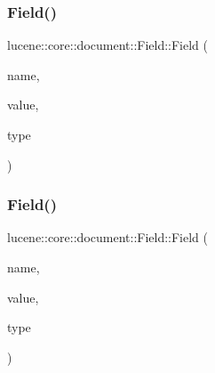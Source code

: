 \mbox{\label{classlucene_1_1core_1_1document_1_1Field_af5870317c74d273ed0afd4715904a9e5}} 
\subsubsection{\texorpdfstring{Field()}{Field()}\hspace{0.1cm}{\footnotesize\ttfamily [8/11]}}
{\footnotesize\ttfamily lucene\+::core\+::document\+::\+Field\+::\+Field (\begin{DoxyParamCaption}\item[{\mbox{\hyperlink{ZlibCrc32_8h_a2c212835823e3c54a8ab6d95c652660e}{const}} std\+::string \&}]{name,  }\item[{\mbox{\hyperlink{ZlibCrc32_8h_a2c212835823e3c54a8ab6d95c652660e}{const}} std\+::string \&}]{value,  }\item[{\mbox{\hyperlink{ZlibCrc32_8h_a2c212835823e3c54a8ab6d95c652660e}{const}} \mbox{\hyperlink{classlucene_1_1core_1_1document_1_1FieldType}{Field\+Type}} \&}]{type }\end{DoxyParamCaption})\hspace{0.3cm}{\ttfamily [inline]}}

\mbox{\label{classlucene_1_1core_1_1document_1_1Field_aaa472d50639e11ca10e5e06fe07fb87c}} 
\subsubsection{\texorpdfstring{Field()}{Field()}\hspace{0.1cm}{\footnotesize\ttfamily [9/11]}}
{\footnotesize\ttfamily lucene\+::core\+::document\+::\+Field\+::\+Field (\begin{DoxyParamCaption}\item[{\mbox{\hyperlink{ZlibCrc32_8h_a2c212835823e3c54a8ab6d95c652660e}{const}} std\+::string \&}]{name,  }\item[{std\+::string \&\&}]{value,  }\item[{\mbox{\hyperlink{ZlibCrc32_8h_a2c212835823e3c54a8ab6d95c652660e}{const}} \mbox{\hyperlink{classlucene_1_1core_1_1document_1_1FieldType}{Field\+Type}} \&}]{type }\end{DoxyParamCaption})\hspace{0.3cm}{\ttfamily [inline]}}

